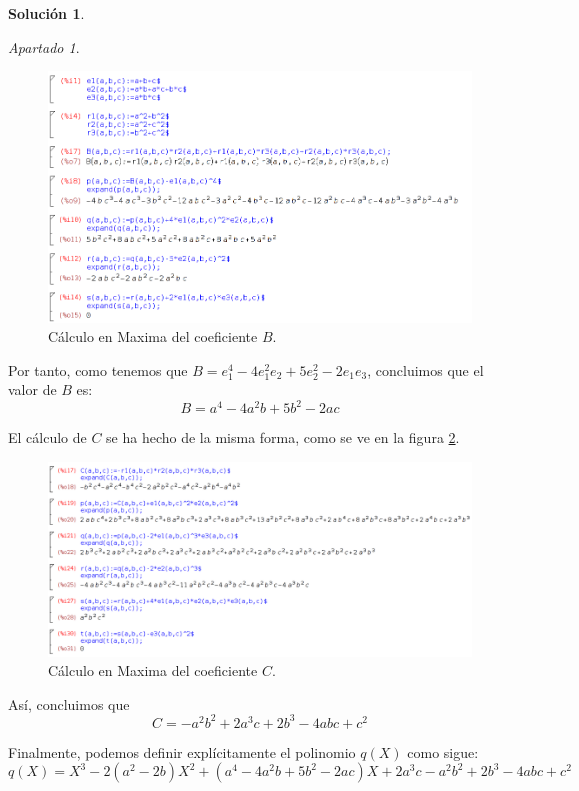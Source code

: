\documentclass[a4paper, 11pt]{article}
\theoremstyle{definition}
\newtheorem*{solucion}{Solución}
\theoremstyle{remark}
\newtheorem{apartado}{Apartado}[ejercicio]
\begin{document}
\begin{solucion}
\begin{apartado}
           \begin{figure}[ht!]
               \centering
               \includegraphics[width=130mm]{IMG/S02-01.png}
               \caption{Cálculo en Maxima del coeficiente $B$. \label{algoritmo}}
           \end{figure}

           Por tanto, como tenemos que $B = e_1^4-4e_1^2e_2+5e_2^2-2e_1e_3$, concluimos que el valor de $B$ es:
           \[
           \boxed{B = a^4 - 4a^2b + 5b^2 - 2ac}
           \]

           El cálculo de $C$ se ha hecho de la misma forma, como se ve en la figura \ref{algoritmo2}.

           \begin{figure}[ht!]
               \centering
               \includegraphics[width=140mm]{IMG/S02-02.png}
               \caption{Cálculo en Maxima del coeficiente $C$. \label{algoritmo2}}
           \end{figure}

           Así, concluimos que
           \[
           \boxed{C = -a^2b^2 + 2a^3c + 2b^3 -4abc +c^2}
           \]

           Finalmente, podemos definir explícitamente el polinomio $q(X)$ como sigue:
           \[
           \boxed{q(X) = X^3 - 2(a^2-2b)X^2 + (a^4 - 4a^2b + 5b^2 - 2ac)X + 2a^3c - a^2b^2 + 2b^3 -4abc +c^2}
           \]
      \end{apartado}
  \end{solucion}
\end{document}
